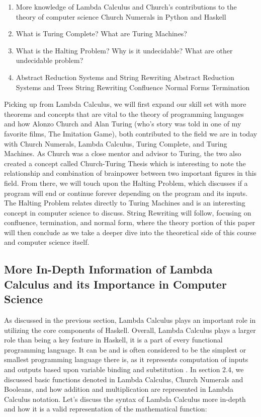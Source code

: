 \documentclass{article}
\begin{document}
\begin{enumerate}
    \item More knowledge of Lambda Calculus and Church's contributions to the theory of computer science
        Church Numerals in Python and Haskell
    \item What is Turing Complete?
         What are Turing Machines?
    \item What is the Halting Problem? 
         Why is it undecidable? 
         What are other undecidable problem?
    \item Abstract Reduction Systems and String Rewriting
        Abstract Reduction Systems and Trees
        String Rewriting
            \subsubitem{ -  }Confluence
            \subsubitem{ -  }Normal Forms
            \subsubitem{ -  }Termination
\end{enumerate}

\medskip\noindent
Picking up from Lambda Calculus, we will first expand our skill set with more theorems and concepts that are vital to the theory of programming languages and how Alonzo Church and Alan Turing (who's story was told in one of my favorite films, The Imitation Game), both contributed to the field we are in today with Church Numerals, Lambda Calculus, Turing Complete, and Turing Machines. As Church was a close mentor and advisor to Turing, the two also created a concept called Church-Turing Thesis which is interesting to note the relationship and combination of brainpower between two important figures in this field. From there, we will touch upon the Halting Problem, which discusses if a program will end or continue forever depending on the program and its inputs. The Halting Problem relates directly to Turing Machines and is an interesting concept in computer science to discuss. String Rewriting will follow, focusing on confluence, termination, and normal form, where the theory portion of this paper will then conclude as we take a deeper dive into the theoretical side of this course and computer science itself.

\subsection{More In-Depth Information of Lambda Calculus and its Importance in Computer Science}

As discussed in the previous section, Lambda Calculus plays an important role in utilizing the core components of Haskell. Overall, Lambda Calculus plays a larger role than being a key feature in Haskell, it is a part of every functional programming language. It can be and is often considered to be the simplest or smallest programming language there is, as it represents computation of inputs and outputs based upon variable binding and substitution \cite{JRebel}. In section 2.4, we discussed basic functions denoted in Lambda Calculus, Church Numerals and Booleans, and how addition and multiplication are represented in Lambda Calculus notation. Let's discuss the syntax of Lambda Calculus more in-depth and how it is a valid representation of the mathematical function:
\end{document}
